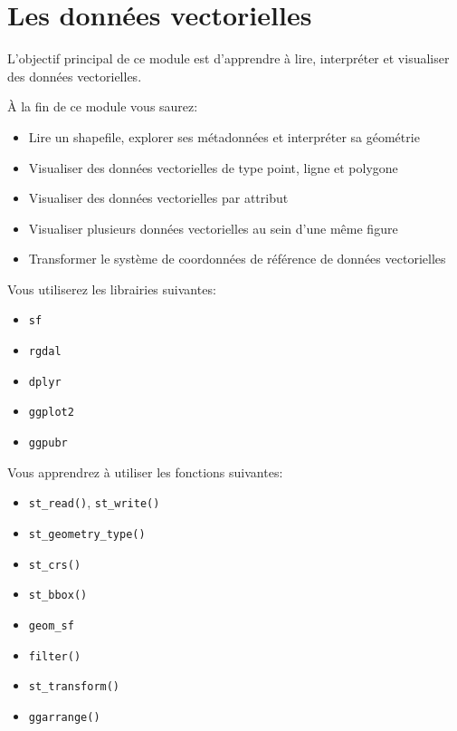 \documentclass[]{article}
\author{}
\date{\vspace{-2.5em}}
\providecommand{\tightlist}{%
  \setlength{\itemsep}{0pt}\setlength{\parskip}{0pt}}
\begin{document}
\section{Les données vectorielles}\label{vec}

L'objectif principal de ce module est d'apprendre à lire, interpréter et
visualiser des données vectorielles.

À la fin de ce module vous saurez:

\begin{itemize}
\tightlist
\item
  Lire un shapefile, explorer ses métadonnées et interpréter sa
  géométrie
\item
  Visualiser des données vectorielles de type point, ligne et polygone
\item
  Visualiser des données vectorielles par attribut
\item
  Visualiser plusieurs données vectorielles au sein d'une même figure
\item
  Transformer le système de coordonnées de référence de données
  vectorielles
\end{itemize}

Vous utiliserez les librairies suivantes:

\begin{itemize}
\tightlist
\item
  \texttt{sf}
\item
  \texttt{rgdal}
\item
  \texttt{dplyr}
\item
  \texttt{ggplot2}
\item
  \texttt{ggpubr}
\end{itemize}

Vous apprendrez à utiliser les fonctions suivantes:

\begin{itemize}
\tightlist
\item
  \texttt{st\_read()}, \texttt{st\_write()}
\item
  \texttt{st\_geometry\_type()}
\item
  \texttt{st\_crs()}
\item
  \texttt{st\_bbox()}
\item
  \texttt{geom\_sf}
\item
  \texttt{filter()}
\item
  \texttt{st\_transform()}
\item
  \texttt{ggarrange()}
\end{itemize}
\end{document}
